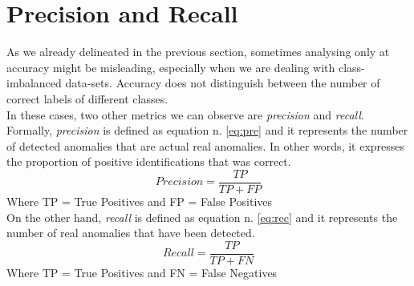 \section{Precision and Recall}
As we already delineated in the previous section, sometimes analysing only at accuracy might be misleading, especially when we are dealing with class-imbalanced data-sets. Accuracy does not distinguish between the number of correct labels of different classes. \cite{metrics}\\
In these cases, two other metrics we can observe are \textit{precision} and \textit{recall}. \\
Formally, \textit{precision} is defined as equation n. \ref{eq:pre} and it represents the number of detected anomalies that are actual real anomalies.\cite{tatbul2019precision}
In other words, it expresses the proportion of positive identifications that was correct. 
\begin{equation}
Precision = \dfrac{TP}{TP+FP}
\label{eq:pre}    
\end{equation}
Where TP = True Positives and FP = False Positives\\
On the other hand, \textit{recall} is defined as equation n. \ref{eq:rec} and it represents the number of real anomalies that have been detected.\cite{tatbul2019precision}
\begin{equation}
Recall = \dfrac{TP}{TP+FN}
\label{eq:rec}    
\end{equation}
Where TP = True Positives and FN = False Negatives\\

